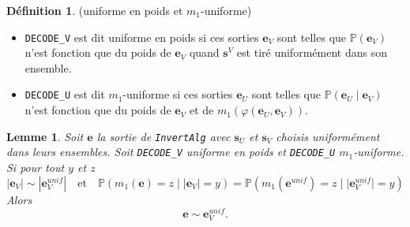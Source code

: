 \documentclass[12pt]{article}
\theoremstyle{plain}
\newtheorem{lemme}[thm]{Lemme}
\theoremstyle{definition}
\newtheorem{defi}[thm]{Définition}
\begin{document}
\begin{defi} (uniforme en poids et $m_1$-uniforme)
\begin{itemize}
\item \verb|DECODE_V| est dit uniforme en poids si ces sorties $\mathbf{e}_V$ sont telles que $\mathbb{P}(\mathbf{e}_V)$ n'est fonction que du poids de $\mathbf{e}_V$ quand $\mathbf{s}^V$ est tiré uniformément dans son ensemble.
\item \verb|DECODE_U| est dit $m_1$-uniforme si ces sorties $\mathbf{e}_U$ sont telles que $\mathbb{P}(\mathbf{e}_U\; |\;  \mathbf{e}_V)$ n'est fonction que du poids de $\mathbf{e}_V$ et de $m_1(\varphi(\mathbf{e}_U,\mathbf{e}_V))$.
\end{itemize}
\end{defi}

\begin{lemme} Soit $\mathbf{e}$ la sortie de \verb|InvertAlg| avec $\mathbf{s}_U$ et $\mathbf{s}_V$ choisis uniformément dans leurs ensembles. Soit \verb|DECODE_V| uniforme en poids et \verb|DECODE_U| $m_1$-uniforme. Si pour tout $y$ et $z$ 
$$|\mathbf{e}_V| \sim |\mathbf{e}_V^{unif}|\quad \text{et} \quad\mathbb{P}(m_1(\mathbf{e}) = z\; |\; |\mathbf{e}_V| = y) = \mathbb{P}(m_1(\mathbf{e}^{unif}) = z\; |\; |\mathbf{e}_V^{unif}| = y)$$
Alors
$$ \mathbf{e} \sim \mathbf{e}_V^{unif}.$$
\end{lemme}
\end{document}
